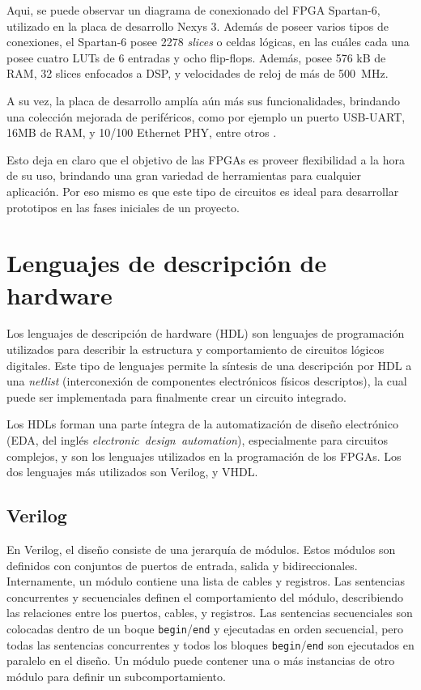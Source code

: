 Aqui, se puede observar un diagrama de conexionado del FPGA Spartan-6, utilizado en la placa de desarrollo Nexys 3. Además de poseer varios tipos de conexiones, el Spartan-6 posee 2278 \mbox{\emph{slices}} o celdas lógicas, en las cuáles cada una posee cuatro LUTs de 6 entradas y ocho flip-flops. Además, posee 576 kB de RAM, 32 slices enfocados a DSP, y velocidades de reloj de más de \SI{500}{\mega\hertz}. 

A su vez, la placa de desarrollo amplía aún más sus funcionalidades, brindando una colección mejorada de periféricos, como por ejemplo un puerto USB-UART, 16MB de RAM, y 10/100 Ethernet PHY, entre otros \cite{nexys3}.

Esto deja en claro que el objetivo de las FPGAs es proveer flexibilidad a la hora de su uso, brindando una gran variedad de herramientas para cualquier aplicación. Por eso mismo es que este tipo de circuitos es ideal para desarrollar prototipos en las fases iniciales de un proyecto.

\section{Lenguajes de descripción de hardware}

Los lenguajes de descripción de hardware (HDL) son lenguajes de programación utilizados para describir la estructura y comportamiento de circuitos lógicos digitales. Este tipo de lenguajes permite la síntesis de una descripción por HDL a una \emph{netlist} (interconexión de componentes electrónicos físicos descriptos), la cual puede ser implementada para finalmente crear un circuito integrado.

Los HDLs forman una parte íntegra de la automatización de diseño electrónico (EDA, del inglés \mbox{\emph{electronic design automation}}), especialmente para circuitos complejos, y son los lenguajes utilizados en la programación de los FPGAs. Los dos lenguajes más utilizados son Verilog, y VHDL.

\subsection{Verilog}

En Verilog, el diseño consiste de una jerarquía de módulos. Estos módulos son definidos con conjuntos de puertos de entrada, salida y bidireccionales. Internamente, un módulo contiene una lista de cables y registros. Las sentencias concurrentes y secuenciales definen el comportamiento del módulo, describiendo las relaciones entre los puertos, cables, y registros. Las sentencias secuenciales son colocadas dentro de un boque \texttt{begin}/\texttt{end} y ejecutadas en orden secuencial, pero todas las sentencias concurrentes y todos los bloques \texttt{begin}/\texttt{end} son ejecutados en paralelo en el diseño. Un módulo puede contener una o más instancias de otro módulo para definir un subcomportamiento.

